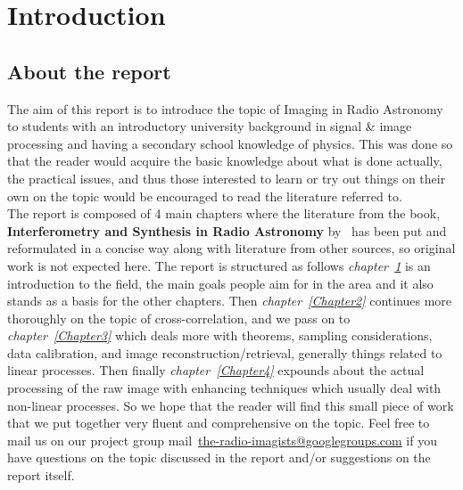 
\chapter{Introduction} %

\label{Chapter1} %


\section{About the report}
\label{sec:about1}
The aim of this report is to introduce the topic of Imaging in Radio Astronomy to students with an introductory university background in signal \& image processing and having a secondary school knowledge of physics. This was done so that the reader would acquire the basic knowledge about what is done actually, the practical issues, and thus those interested to learn or try out things on their own on the topic would be encouraged to read the literature referred to.\\

The report is composed of 4 main chapters where the literature from the book, {\bf Interferometry and Synthesis in Radio Astronomy} by~\citet*{thompson2008interferometry} has been put and reformulated in a concise way along with literature from other sources, so original work is not expected here. The report is structured as follows \textit{chapter~\ref{Chapter1}} is an introduction to the field, the main goals people aim for in the area and it also stands as a basis for the other chapters. Then \textit{chapter~\ref{Chapter2}} continues more thoroughly on the topic of cross-correlation, and we pass on to \textit{chapter~\ref{Chapter3}} which deals more with theorems, sampling considerations, data calibration, and image reconstruction/retrieval, generally things related to linear processes. Then finally \textit{chapter~\ref{Chapter4}} expounds about the actual processing of the raw image with enhancing techniques which usually deal with non-linear processes. So we hope that the reader will find this small piece of work that we put together very fluent and comprehensive on the topic. Feel free to mail us on our project group mail~\href{mailto:the-radio-imagists@googlegroups.com}{the-radio-imagists@googlegroups.com} if you have questions on the topic discussed in the report and/or suggestions on the report itself.
